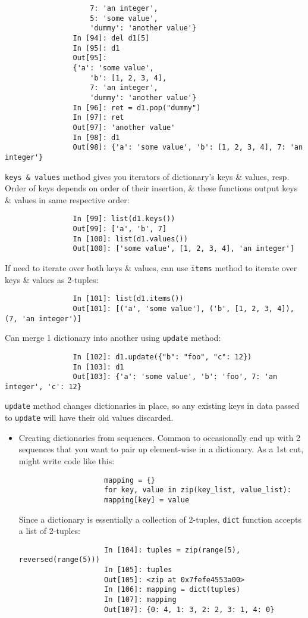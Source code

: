 \documentclass{article}
\begin{document}
\begin{itemize}
\begin{itemize}
\begin{itemize}
\begin{verbatim}
					7: 'an integer',
					5: 'some value',
					'dummy': 'another value'}
				In [94]: del d1[5]
				In [95]: d1
				Out[95]:
				{'a': 'some value',
					'b': [1, 2, 3, 4],
					7: 'an integer',
					'dummy': 'another value'}
				In [96]: ret = d1.pop("dummy")
				In [97]: ret
				Out[97]: 'another value'
				In [98]: d1
				Out[98]: {'a': 'some value', 'b': [1, 2, 3, 4], 7: 'an integer'}
			\end{verbatim}
			{\tt keys \& values} method gives you iterators of dictionary's keys \& values, resp. Order of keys depends on order of their insertion, \& these functions output keys \& values in same respective order:
			\begin{verbatim}
				In [99]: list(d1.keys())
				Out[99]: ['a', 'b', 7]
				In [100]: list(d1.values())
				Out[100]: ['some value', [1, 2, 3, 4], 'an integer']
			\end{verbatim}
			If need to iterate over both keys \& values, can use {\tt items} method to iterate over keys \& values as 2-tuples:
			\begin{verbatim}
				In [101]: list(d1.items())
				Out[101]: [('a', 'some value'), ('b', [1, 2, 3, 4]), (7, 'an integer')]
			\end{verbatim}
			Can merge 1 dictionary into another using {\tt update} method:
			\begin{verbatim}
				In [102]: d1.update({"b": "foo", "c": 12})
				In [103]: d1
				Out[103]: {'a': 'some value', 'b': 'foo', 7: 'an integer', 'c': 12}
			\end{verbatim}
			{\tt update} method changes dictionaries in place, so any existing keys in data passed to {\tt update} will have their old values discarded.
			\begin{itemize}
				\item {\sf Creating dictionaries from sequences.} Common to occasionally end up with 2 sequences that you want to pair up element-wise in a dictionary. As a 1st cut, might write code like this:
				\begin{verbatim}
					mapping = {}
					for key, value in zip(key_list, value_list):
					mapping[key] = value
				\end{verbatim}
				Since a dictionary is essentially a collection of 2-tuples, {\tt dict} function accepts a list of 2-tuples:
				\begin{verbatim}
					In [104]: tuples = zip(range(5), reversed(range(5)))
					In [105]: tuples
					Out[105]: <zip at 0x7fefe4553a00>
					In [106]: mapping = dict(tuples)
					In [107]: mapping
					Out[107]: {0: 4, 1: 3, 2: 2, 3: 1, 4: 0}

\end{verbatim}
\end{itemize}
\end{itemize}
\end{itemize}
\end{itemize}
\end{document}
